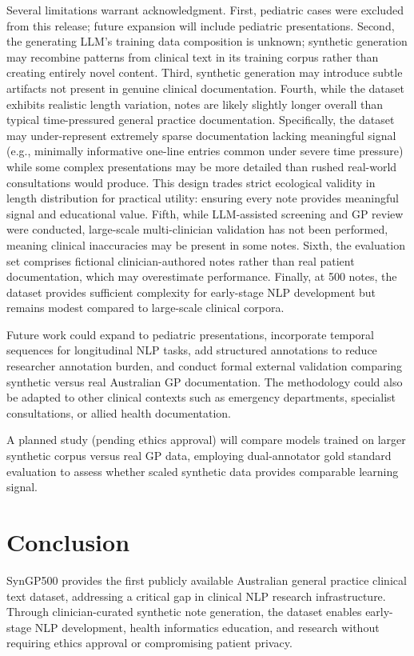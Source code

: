 \documentclass[11pt]{article}
\begin{document}
Several limitations warrant acknowledgment. First, pediatric cases were excluded from this release; future expansion will include pediatric presentations. Second, the generating LLM's training data composition is unknown; synthetic generation may recombine patterns from clinical text in its training corpus rather than creating entirely novel content. Third, synthetic generation may introduce subtle artifacts not present in genuine clinical documentation. Fourth, while the dataset exhibits realistic length variation, notes are likely slightly longer overall than typical time-pressured general practice documentation. Specifically, the dataset may under-represent extremely sparse documentation lacking meaningful signal (e.g., minimally informative one-line entries common under severe time pressure) while some complex presentations may be more detailed than rushed real-world consultations would produce. This design trades strict ecological validity in length distribution for practical utility: ensuring every note provides meaningful signal and educational value. Fifth, while LLM-assisted screening and GP review were conducted, large-scale multi-clinician validation has not been performed, meaning clinical inaccuracies may be present in some notes. Sixth, the evaluation set comprises fictional clinician-authored notes rather than real patient documentation, which may overestimate performance. Finally, at 500 notes, the dataset provides sufficient complexity for early-stage NLP development but remains modest compared to large-scale clinical corpora.

Future work could expand to pediatric presentations, incorporate temporal sequences for longitudinal NLP tasks, add structured annotations to reduce researcher annotation burden, and conduct formal external validation comparing synthetic versus real Australian GP documentation. The methodology could also be adapted to other clinical contexts such as emergency departments, specialist consultations, or allied health documentation.

A planned study (pending ethics approval) will compare models trained on larger synthetic corpus versus real GP data, employing dual-annotator gold standard evaluation to assess whether scaled synthetic data provides comparable learning signal.

\section{Conclusion}

SynGP500 provides the first publicly available Australian general practice clinical text dataset, addressing a critical gap in clinical NLP research infrastructure. Through clinician-curated synthetic note generation, the dataset enables early-stage NLP development, health informatics education, and research without requiring ethics approval or compromising patient privacy.
\end{document}
